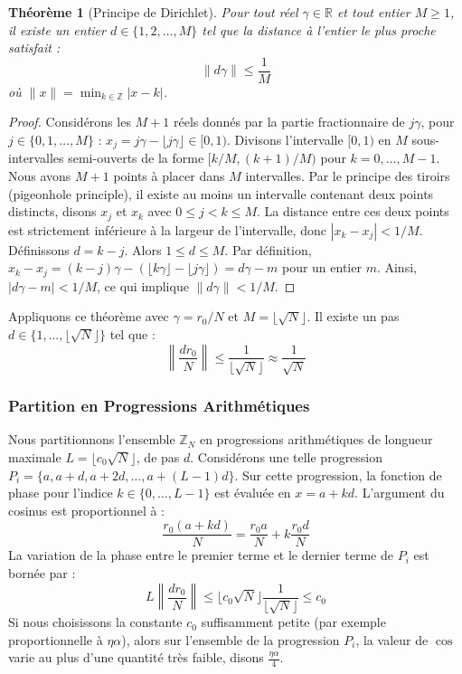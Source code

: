 \documentclass[12pt, a4paper]{article}
\newtheorem{theorem}{Théorème}[section]
\begin{document}
\begin{theorem}[Principe de Dirichlet]
Pour tout réel $\gamma \in \mathbb{R}$ et tout entier $M \geq 1$, il existe un entier $d \in \{1, 2, \dots, M\}$ tel que la distance à l'entier le plus proche satisfait :
\begin{equation}
\|d \gamma\| \leq \frac{1}{M}
\end{equation}
où $\|x\| = \min_{k \in \mathbb{Z}} |x - k|$.
\end{theorem}
\begin{proof}
Considérons les $M+1$ réels donnés par la partie fractionnaire de $j\gamma$, pour $j \in \{0, 1, \dots, M\}$ : $x_j = j\gamma - \lfloor j\gamma \rfloor \in [0, 1)$.
Divisons l'intervalle $[0, 1)$ en $M$ sous-intervalles semi-ouverts de la forme $[k/M, (k+1)/M)$ pour $k=0, \dots, M-1$.
Nous avons $M+1$ points à placer dans $M$ intervalles. Par le principe des tiroirs (pigeonhole principle), il existe au moins un intervalle contenant deux points distincts, disons $x_j$ et $x_k$ avec $0 \leq j < k \leq M$.
La distance entre ces deux points est strictement inférieure à la largeur de l'intervalle, donc $|x_k - x_j| < 1/M$.
Définissons $d = k - j$. Alors $1 \leq d \leq M$.
Par définition, $x_k - x_j = (k-j)\gamma - (\lfloor k\gamma \rfloor - \lfloor j\gamma \rfloor) = d\gamma - m$ pour un entier $m$.
Ainsi, $|d\gamma - m| < 1/M$, ce qui implique $\|d\gamma\| < 1/M$.
\end{proof}

Appliquons ce théorème avec $\gamma = r_0 / N$ et $M = \lfloor \sqrt{N} \rfloor$. Il existe un pas $d \in \{1, \dots, \lfloor \sqrt{N} \rfloor\}$ tel que :
\begin{equation}
\left\| \frac{d r_0}{N} \right\| \leq \frac{1}{\lfloor \sqrt{N} \rfloor} \approx \frac{1}{\sqrt{N}}
\end{equation}

\subsubsection{Partition en Progressions Arithmétiques}

Nous partitionnons l'ensemble $\mathbb{Z}_N$ en progressions arithmétiques de longueur maximale $L = \lfloor c_0 \sqrt{N} \rfloor$, de pas $d$.
Considérons une telle progression $P_i = \{a, a+d, a+2d, \dots, a+(L-1)d\}$.
Sur cette progression, la fonction de phase pour l'indice $k \in \{0, \dots, L-1\}$ est évaluée en $x = a + kd$. L'argument du cosinus est proportionnel à :
\begin{equation}
\frac{r_0 (a + kd)}{N} = \frac{r_0 a}{N} + k \frac{r_0 d}{N}
\end{equation}
La variation de la phase entre le premier terme et le dernier terme de $P_i$ est bornée par :
\begin{equation}
L \left\| \frac{d r_0}{N} \right\| \leq \lfloor c_0 \sqrt{N} \rfloor \frac{1}{\lfloor \sqrt{N} \rfloor} \leq c_0
\end{equation}
Si nous choisissons la constante $c_0$ suffisamment petite (par exemple proportionnelle à $\eta \alpha$), alors sur l'ensemble de la progression $P_i$, la valeur de $\cos$ varie au plus d'une quantité très faible, disons $\frac{\eta \alpha}{4}$.
\end{document}

